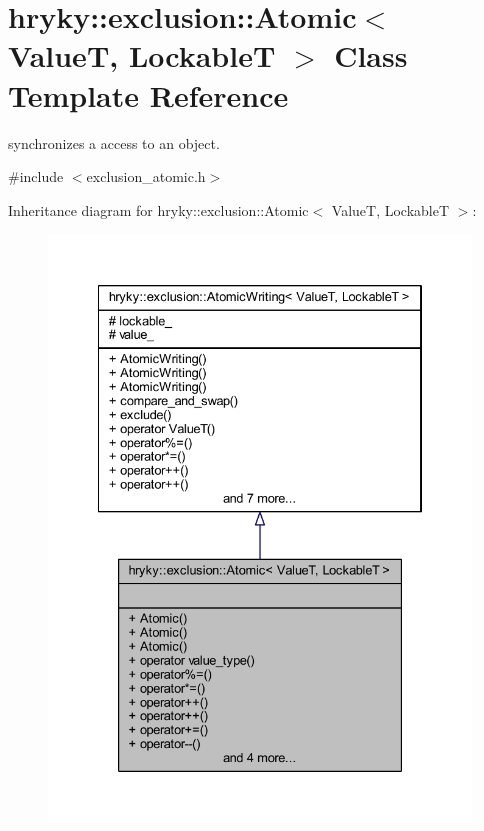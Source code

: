 \hypertarget{classhryky_1_1exclusion_1_1_atomic}{\section{hryky\-:\-:exclusion\-:\-:Atomic$<$ Value\-T, Lockable\-T $>$ Class Template Reference}
\label{classhryky_1_1exclusion_1_1_atomic}
}


synchronizes a access to an object.  




{\ttfamily \#include $<$exclusion\-\_\-atomic.\-h$>$}



Inheritance diagram for hryky\-:\-:exclusion\-:\-:Atomic$<$ Value\-T, Lockable\-T $>$\-:\nopagebreak
\begin{figure}[H]
\begin{center}
\leavevmode
\includegraphics[width=334pt]{classhryky_1_1exclusion_1_1_atomic__inherit__graph}
\end{center}
\end{figure}
